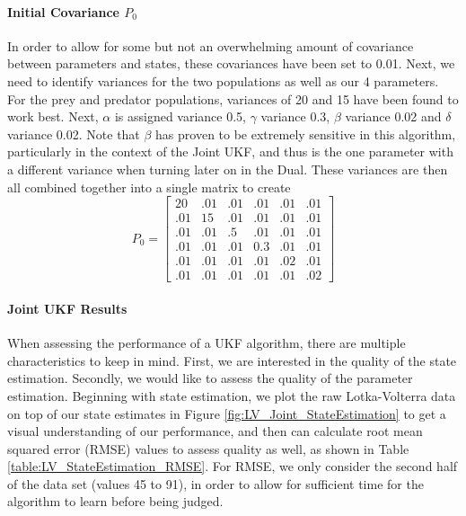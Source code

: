 \paragraph{Initial Covariance $P_0$}
In order to allow for some but not an overwhelming amount of covariance between parameters and states, these covariances have been set to 0.01. Next, we need to identify variances for the two populations as well as our 4 parameters. For the prey and predator populations, variances of 20 and 15 have been found to work best. Next, $\alpha$ is assigned variance 0.5, $\gamma$ variance 0.3, $\beta$ variance 0.02 and $\delta$ variance 0.02. Note that $\beta$ has proven to be extremely sensitive in this algorithm, particularly in the context of the Joint UKF, and thus is the one parameter with a different variance when turning later on in the Dual. These variances are then all combined together into a single matrix to create
\begin{equation}
P_{0} = \begin{bmatrix}
20 & .01 & .01 & .01 & .01 & .01\\
.01 & 15 & .01 & .01 & .01 & .01\\
.01 & .01 & .5 & .01 & .01 & .01\\
.01 & .01 & .01 & 0.3 & .01 & .01\\
.01 & .01 & .01 & .01  & .02 & .01\\
.01 & .01 & .01 & .01 & .01 & .02\end{bmatrix}
\end{equation}


\paragraph{Joint UKF Results}
When assessing the performance of a UKF algorithm, there are multiple characteristics to keep in mind. First, we are interested in the quality of the state estimation. Secondly, we would like to assess the quality of the parameter estimation. Beginning with state estimation, we plot the raw Lotka-Volterra data on top of our state estimates in Figure \ref{fig:LV_Joint_StateEstimation} to get a visual understanding of our performance, and then can calculate root mean squared error (RMSE) values to assess quality as well, as shown in Table \ref{table:LV_StateEstimation_RMSE}. For RMSE, we only consider the second half of the data set (values 45 to 91), in order to allow for sufficient time for the algorithm to learn before being judged.\\ 


